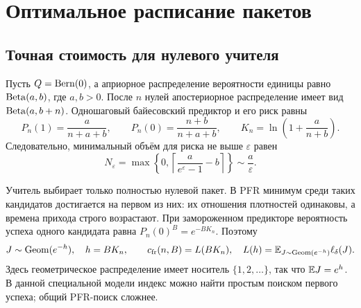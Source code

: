 \section{Оптимальное расписание пакетов}
\label{sec:batch}

\subsection{Точная стоимость для нулевого учителя}

Пусть $Q=\operatorname{Bern}(0)$, а априорное распределение вероятности единицы равно
$\operatorname{Beta}(a,b)$, где $a,b>0$. После $n$ нулей апостериорное распределение имеет вид
$\operatorname{Beta}(a,b+n)$. Одношаговый байесовский предиктор и его риск равны
\begin{equation}
 P_n(1)=\frac{a}{n+a+b},\qquad
 P_n(0)=\frac{n+b}{n+a+b},\qquad
 K_n=\ln\left(1+\frac{a}{n+b}\right).
 \label{eq:beta-risk}
\end{equation}
Следовательно, минимальный объём для риска не выше $\varepsilon$ равен
\begin{equation}
 N_\varepsilon=\max\left\{0,
  \left\lceil\frac{a}{e^\varepsilon-1}-b\right\rceil\right\}
   \sim\frac{a}{\varepsilon}.
 \label{eq:target-N}
\end{equation}

Учитель выбирает только полностью нулевой пакет. В PFR минимум среди таких
кандидатов достигается на первом из них: их отношения плотностей одинаковы,
а времена прихода строго возрастают. При замороженном предикторе вероятность
успеха одного кандидата равна $P_n(0)^B=e^{-BK_n}$. Поэтому
\begin{equation}
 J\sim\operatorname{Geom}(e^{-h}),\quad h=BK_n,\qquad
 c_{\rm fr}(n,B)=L(BK_n),\quad
 L(h)=\mathbb E_{J\sim\operatorname{Geom}(e^{-h})}\ell_\delta(J).
 \label{eq:exact-transition}
\end{equation}
Здесь геометрическое распределение имеет носитель $\{1,2,\dots\}$, так что
$\mathbb E J=e^h$. В данной специальной модели индекс можно найти простым поиском
первого успеха; общий PFR-поиск сложнее.

